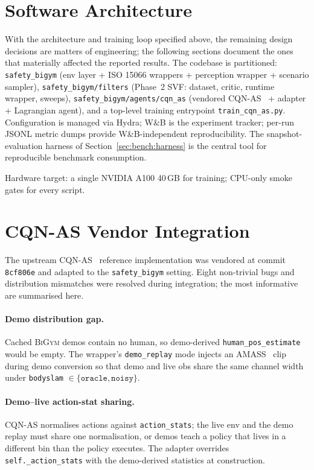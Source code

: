 \documentclass[11pt,a4paper]{report}
\newcommand{\bigym}{\textsc{BiGym}}
\newcommand{\sbigym}{\texttt{safety\_bigym}}
\newcommand{\cqnas}{CQN-AS}
\begin{document}
\section{Software Architecture}
\label{sec:impl:arch}

With the architecture and training loop specified above, the
remaining design decisions are matters of engineering; the following
sections document the ones that materially affected the reported
results. The codebase is partitioned: \sbigym{} (env layer + ISO 15066
wrappers + perception wrapper + scenario sampler),
\texttt{safety\_bigym/filters} (Phase~2 SVF: dataset, critic,
runtime wrapper, sweeps),
\texttt{safety\_bigym/agents/cqn\_as} (vendored
\cqnas{}~\cite{seo2024cqnas} + adapter + Lagrangian agent), and a
top-level training entrypoint \texttt{train\_cqn\_as.py}.
Configuration is managed via Hydra; W\&B is the experiment tracker;
per-run JSONL metric dumps provide W\&B-independent reproducibility.
The snapshot-evaluation harness of Section~\ref{sec:bench:harness}
is the central tool for reproducible benchmark consumption.

Hardware target: a single NVIDIA A100 40\,GB for training;
CPU-only smoke gates for every script.

\section{\cqnas{} Vendor Integration}
\label{sec:impl:integration}

The upstream \cqnas{}~\cite{seo2024cqnas} reference implementation
was vendored at commit \texttt{8cf806e} and adapted to the
\sbigym{} setting. Eight non-trivial bugs and distribution
mismatches were resolved during integration; the most informative
are summarised here.

\paragraph{Demo distribution gap.}
Cached \bigym{} demos contain no human, so demo-derived
\texttt{human\_pos\_estimate} would be empty. The wrapper's
\texttt{demo\_replay} mode injects an
AMASS~\cite{mahmood2019amass} clip during demo conversion so that
demo and live obs share the same channel width under
\texttt{bodyslam} $\in \{\texttt{oracle}, \texttt{noisy}\}$.

\paragraph{Demo--live action-stat sharing.}
\cqnas{} normalises actions against \texttt{action\_stats}; the
live env and the demo replay must share one normalisation, or
demos teach a policy that lives in a different bin than the policy
executes. The adapter overrides \texttt{self.\_action\_stats} with
the demo-derived statistics at construction.
\end{document}

